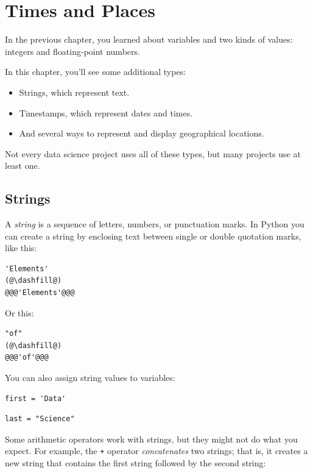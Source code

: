 \hypertarget{times-and-places}{%
\chapter{Times and Places}\label{times-and-places}}

In the previous chapter, you learned about variables and two kinds of
values: integers and floating-point numbers.

In this chapter, you'll see some additional types:

\begin{itemize}
\item
  Strings, which represent text.
\item
  Timestamps, which represent dates and times.
\item
  And several ways to represent and display geographical locations.
\end{itemize}

Not every data science project uses all of these types, but many
projects use at least one.

\hypertarget{strings}{%
\section{Strings}\label{strings}}

A \emph{string} is a sequence of letters, numbers, or punctuation
marks. In Python you can create a string by enclosing text between
single or double quotation marks, like this:

\begin{lstlisting}[]
'Elements'
(@\dashfill@)
@@@'Elements'@@@
\end{lstlisting}

Or this:

\begin{lstlisting}[]
"of"
(@\dashfill@)
@@@'of'@@@
\end{lstlisting}

You can also assign string values to variables:

\begin{lstlisting}[]
first = 'Data'
\end{lstlisting}

\begin{lstlisting}[]
last = "Science"
\end{lstlisting}

Some arithmetic operators work with strings, but they might not do what
you expect. For example, the \passthrough{\lstinline!+!} operator
\emph{concatenates} two strings; that is, it creates a new string that
contains the first string followed by the second string:

